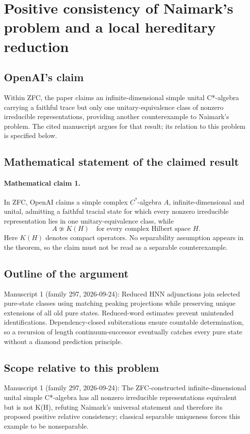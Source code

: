 \documentclass[11pt]{article}
\begin{document}
\section*{Positive consistency of Naimark's problem and a local hereditary reduction}

\subsection{OpenAI's claim}
Within ZFC, the paper claims an infinite-dimensional simple unital C*-algebra carrying a faithful trace but only one unitary-equivalence class of nonzero irreducible representations, providing another counterexample to Naimark's problem. The cited manuscript argues for that result; its relation to this problem is specified below.

\subsection{Mathematical statement of the claimed result}
\paragraph{Mathematical claim 1.} In ZFC, OpenAI claims a simple complex $C^*$-algebra $A$, infinite-dimensional and unital, admitting a faithful tracial state for which every nonzero irreducible representation lies in one unitary-equivalence class, while
\[
A\not\simeq K(H)\quad\text{for every complex Hilbert space }H.
\]
Here $K(H)$ denotes compact operators. No separability assumption appears in the theorem, so the claim must not be read as a separable counterexample.

\subsection{Outline of the argument}
Manuscript 1 (family 297, 2026-09-24): Reduced HNN adjunctions join selected pure-state classes using matching peaking projections while preserving unique extensions of all old pure states. Reduced-word estimates prevent unintended identifications. Dependency-closed subiterations ensure countable determination, so a recursion of length continuum-successor eventually catches every pure state without a diamond prediction principle.

\subsection{Scope relative to this problem}
Manuscript 1 (family 297, 2026-09-24): The ZFC-constructed infinite-dimensional unital simple C*-algebra has all nonzero irreducible representations equivalent but is not K(H), refuting Naimark’s universal statement and therefore its proposed positive relative consistency; classical separable uniqueness forces this example to be nonseparable.
\end{document}
